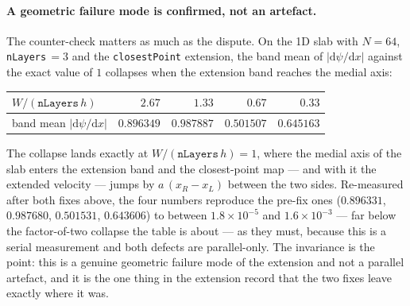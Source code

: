 \documentclass[preprint,3p,11pt]{elsarticle}
\newcommand{\psilev}{\psi}
\begin{document}
\paragraph{A geometric failure mode is confirmed, not an artefact.} The
counter-check matters as much as the dispute. On the 1D slab with $N=64$,
\texttt{nLayers}$\,=3$ and the \texttt{closestPoint} extension, the band mean of
$|\mathrm{d}\psilev/\mathrm{d}x|$ against the exact value of $1$ collapses when
the extension band reaches the medial axis:
\begin{center}
\begin{tabular}{lrrrr}
\toprule
$W/(\texttt{nLayers}\,h)$ & $2.67$ & $1.33$ & $0.67$ & $0.33$ \\
\midrule
band mean $|\mathrm{d}\psilev/\mathrm{d}x|$ & $0.896349$ & $0.987887$ & $0.501507$ & $0.645163$ \\
\bottomrule
\end{tabular}
\end{center}
The collapse lands exactly at $W/(\texttt{nLayers}\,h) = 1$, where the medial axis
of the slab enters the extension band and the closest-point map --- and with it the
extended velocity --- jumps by $a\,(x_R - x_L)$ between the two sides. Re-measured
after both fixes above, the four numbers reproduce the pre-fix ones
($0.896331$, $0.987680$, $0.501531$, $0.643606$) to between $1.8\times10^{-5}$ and
$1.6\times10^{-3}$ --- far below the factor-of-two collapse the table is about ---
as they must, because this is a serial measurement and both defects are
parallel-only. The invariance is
the point: this is a genuine geometric failure mode of the extension and not a
parallel artefact, and it is the one thing in the extension record that the two
fixes leave exactly where it was.

\end{document}
